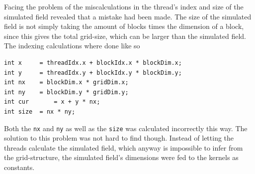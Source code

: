 
Facing the problem of the miscalculations in the thread's index and size of the simulated field revealed that a mistake had been made. The size of the simulated field is not simply taking the amount of blocks times the dimension of a block, since this gives the total grid-size, which can be larger than the simulated field. The indexing calculations where done like so

\begin{verbatim}
int x     = threadIdx.x + blockIdx.x * blockDim.x;
int y     = threadIdx.y + blockIdx.y * blockDim.y;
int nx    = blockDim.x * gridDim.x;
int ny    = blockDim.y * gridDim.y;
int cur 	  = x + y * nx;
int size  = nx * ny;
\end{verbatim}

Both the \texttt{nx} and \texttt{ny} as well as the \texttt{size} was calculated incorrectly this way. The solution to this problem was not hard to find though. Instead of letting the threads calculate the simulated field, which anyway is impossible to infer from the grid-structure, the simulated field's dimensions were fed to the kernels as constants.
